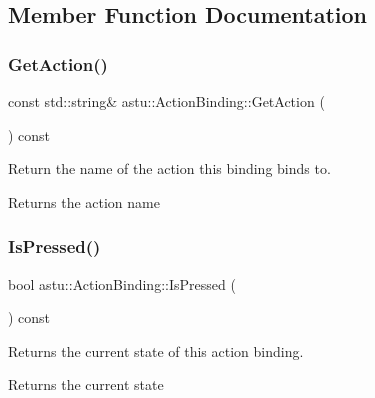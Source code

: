 \subsection{Member Function Documentation}
\mbox{\label{classastu_1_1ActionBinding_aac38902348ebb25b27677ac2ebd44aed}} 
\subsubsection{\texorpdfstring{Get\+Action()}{GetAction()}}
{\footnotesize\ttfamily const std\+::string\& astu\+::\+Action\+Binding\+::\+Get\+Action (\begin{DoxyParamCaption}{ }\end{DoxyParamCaption}) const}

Return the name of the action this binding binds to.

\begin{DoxyReturn}{Returns}
the action name 
\end{DoxyReturn}
\mbox{\label{classastu_1_1ActionBinding_ad0c2ee18d3b6a7719de4463973294467}} 
\subsubsection{\texorpdfstring{Is\+Pressed()}{IsPressed()}}
{\footnotesize\ttfamily bool astu\+::\+Action\+Binding\+::\+Is\+Pressed (\begin{DoxyParamCaption}{ }\end{DoxyParamCaption}) const}

Returns the current state of this action binding.

\begin{DoxyReturn}{Returns}
the current state 
\end{DoxyReturn}
\mbox{\label{classastu_1_1ActionBinding_a56203b1271283b3befebdfc7c67c7836}} 
